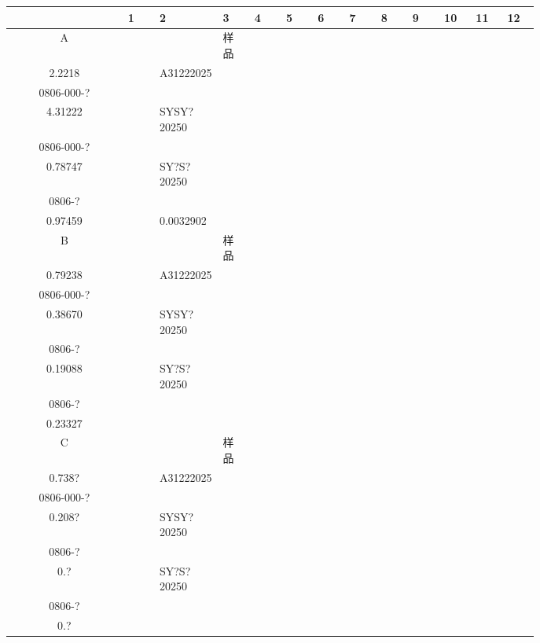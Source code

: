 \documentclass[UTF8,10pt,a4paper,fontset=fandol]{ctexart}
\begin{document}
\begin{center}
\scriptsize
\begin{tabular}{c|p{0.065\linewidth}|p{0.065\linewidth}|p{0.065\linewidth}|p{0.065\linewidth}|p{0.065\linewidth}|p{0.065\linewidth}|p{0.065\linewidth}|p{0.065\linewidth}|p{0.065\linewidth}|p{0.065\linewidth}|p{0.065\linewidth}|p{0.065\linewidth}}
 & 1 & 2 & 3 & 4 & 5 & 6 & 7 & 8 & 9 & 10 & 11 & 12\\ \hline
A & & &
\centering\scriptsize 样品\\[-1mm]\centering\scriptsize 2.2218
& & 
\centering\scriptsize A31222025\\[-1mm]\centering\scriptsize 0806-000-?\\[-1mm]\centering\scriptsize 4.31222
& &
\centering\scriptsize SYSY?20250\\[-1mm]\centering\scriptsize 0806-000-?\\[-1mm]\centering\scriptsize 0.78747
& &
\centering\scriptsize SY?S?20250\\[-1mm]\centering\scriptsize 0806-?\\[-1mm]\centering\scriptsize 0.97459
& &
\centering\scriptsize 0.0032902
& \\ \hline
B & & &
\centering\scriptsize 样品\\[-1mm]\centering\scriptsize 0.79238
& &
\centering\scriptsize A31222025\\[-1mm]\centering\scriptsize 0806-000-?\\[-1mm]\centering\scriptsize 0.38670
& &
\centering\scriptsize SYSY?20250\\[-1mm]\centering\scriptsize 0806-?\\[-1mm]\centering\scriptsize 0.19088
& &
\centering\scriptsize SY?S?20250\\[-1mm]\centering\scriptsize 0806-?\\[-1mm]\centering\scriptsize 0.23327
& & \\ \hline
C & & &
\centering\scriptsize 样品\\[-1mm]\centering\scriptsize 0.738? 
& &
\centering\scriptsize A31222025\\[-1mm]\centering\scriptsize 0806-000-?\\[-1mm]\centering\scriptsize 0.208? 
& &
\centering\scriptsize SYSY?20250\\[-1mm]\centering\scriptsize 0806-?\\[-1mm]\centering\scriptsize 0.? 
& &
\centering\scriptsize SY?S?20250\\[-1mm]\centering\scriptsize 0806-?\\[-1mm]\centering\scriptsize 0.? 

\end{tabular}
\end{center}
\end{document}
